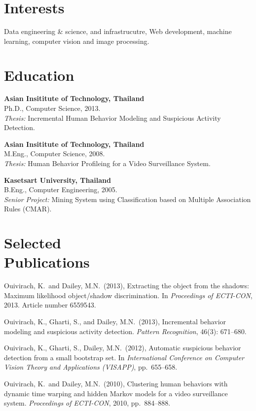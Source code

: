 \documentclass[margin, 10pt]{res}
\begin{document}
\begin{resume}
\section{Interests}

Data engineering \& science, and infrastrucutre, Web development, 
machine learning, computer vision and image processing.

\section{Education}

{\bf Asian Insititute of Technology, Thailand} \\
Ph.D., Computer Science, 2013. \\
{\it Thesis:} Incremental Human Behavior Modeling and Suspicious Activity
Detection.

{\bf Asian Insititute of Technology, Thailand} \\
M.Eng., Computer Science, 2008. \\
{\it Thesis:} Human Behavior Profileing for a Video Surveillance System.

{\bf Kasetsart University, Thailand} \\
B.Eng., Computer Engineering, 2005. \\
{\it Senior Project:} Mining System using Classification based on Multiple
Association Rules (CMAR).

\section{Selected \\ Publications}

Ouivirach, K.\ and Dailey, M.N.\ (2013), Extracting the object from the shadows:
Maximum likelihood object/shadow discrimination. In {\it Proceedings of
ECTI-CON}, 2013. Article number 6559543.

Ouivirach, K., Gharti, S., and Dailey, M.N.\ (2013), Incremental behavior
modeling  and suspicious activity detection. {\it Pattern Recognition}, 46(3):
671--680.

Ouivirach, K., Gharti, S., Dailey, M.N.\ (2012), Automatic suspicious behavior
detection from a small bootstrap set. In {\it International Conference on
Computer Vision Theory and Applications (VISAPP)}, pp.\ 655--658.

Ouivirach, K.\ and Dailey, M.N.\ (2010), Clustering human behaviors with
dynamic time warping and hidden Markov models for a video surveillance system.
{\it Proceedings of ECTI-CON}, 2010, pp.\ 884--888.


\end{resume}
\end{document}
